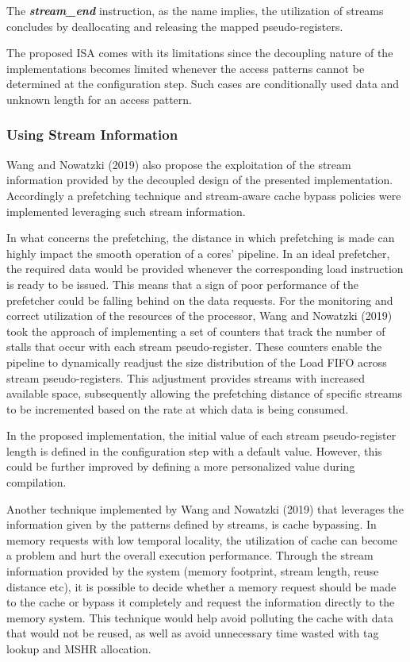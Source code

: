 The \textbf{\textit{stream\_end}} instruction, as the name implies, the utilization of streams concludes by deallocating and releasing the mapped pseudo-registers.

The proposed \acrshort{ISA} comes with its limitations since the decoupling nature of the implementations becomes limited whenever the access patterns cannot be determined at the configuration step. Such cases are conditionally used data and unknown length for an access pattern.


\subsubsection{Using Stream Information}
Wang and Nowatzki (2019) \cite{8980305} also propose the exploitation of the stream information provided by the decoupled design of the presented implementation. Accordingly a prefetching technique and stream-aware cache bypass policies were implemented leveraging such stream information.

In what concerns the prefetching, the distance in which prefetching is made can highly impact the smooth operation of a cores' pipeline. In an ideal prefetcher, the required data would be provided whenever the corresponding load instruction is ready to be issued. This means that a sign of poor performance of the prefetcher could be falling behind on the data requests. For the monitoring and correct utilization of the resources of the processor, Wang and Nowatzki (2019) \cite{8980305} took the approach of implementing a set of counters that track the number of stalls that occur with each stream pseudo-register. These counters enable the pipeline to dynamically readjust the size distribution of the Load FIFO across stream pseudo-registers. This adjustment provides streams with increased available space, subsequently allowing the prefetching distance of specific streams to be incremented based on the rate at which data is being consumed.

In the proposed implementation, the initial value of each stream pseudo-register length is defined in the configuration step with a default value. However, this could be further improved by defining a more personalized value during compilation.

Another technique implemented by Wang and Nowatzki (2019) \cite{8980305} that leverages the information given by the patterns defined by streams, is cache bypassing. In memory requests with low temporal locality, the utilization of cache can become a problem and hurt the overall execution performance. Through the stream information provided by the system (memory footprint, stream length, reuse distance etc), it is possible to decide whether a memory request should be made to the cache or bypass it completely and request the information directly to the memory system. This technique would help avoid polluting the cache with data that would not be reused, as well as avoid unnecessary time wasted with tag lookup and MSHR allocation.


